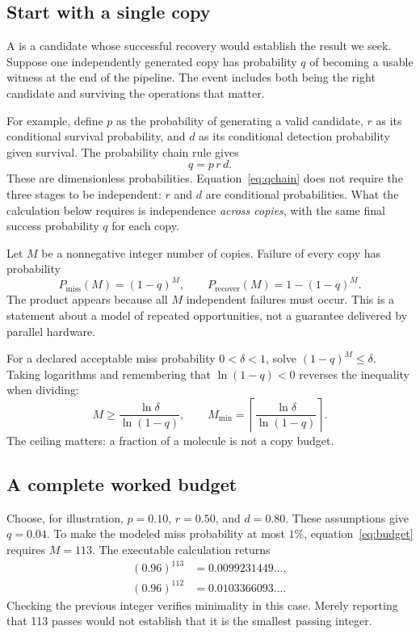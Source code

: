 \subsection{Start with a single copy}

A  is a candidate whose successful recovery would establish the result we seek. Suppose one independently generated copy has probability $q$ of becoming a usable witness at the end of the pipeline. The event includes both being the right candidate and surviving the operations that matter.

For example, define $p$ as the probability of generating a valid candidate, $r$ as its conditional survival probability, and $d$ as its conditional detection probability given survival. The probability chain rule gives
\begin{equation}
q=p\,r\,d. \label{eq:qchain}
\end{equation}
These are dimensionless probabilities. Equation~\ref{eq:qchain} does not require the three stages to be independent: $r$ and $d$ are conditional probabilities. What the calculation below requires is independence \emph{across copies}, with the same final success probability $q$ for each copy.

Let $M$ be a nonnegative integer number of copies. Failure of every copy has probability
\begin{equation}
P_{\mathrm{miss}}(M)=(1-q)^M,\qquad
P_{\mathrm{recover}}(M)=1-(1-q)^M. \label{eq:miss}
\end{equation}
The product appears because all $M$ independent failures must occur. This is a statement about a model of repeated opportunities, not a guarantee delivered by parallel hardware.

For a declared acceptable miss probability $0<\delta<1$, solve $(1-q)^M\leq\delta$. Taking logarithms and remembering that $\ln(1-q)<0$ reverses the inequality when dividing:
\begin{equation}
M\geq\frac{\ln\delta}{\ln(1-q)},\qquad
M_{\min}=\left\lceil\frac{\ln\delta}{\ln(1-q)}\right\rceil.
\label{eq:budget}
\end{equation}
The ceiling matters: a fraction of a molecule is not a copy budget.

\subsection{A complete worked budget}

Choose, for illustration, $p=0.10$, $r=0.50$, and $d=0.80$. These assumptions give $q=0.04$. To make the modeled miss probability at most $1\%$, equation~\ref{eq:budget} requires $M=113$. The executable calculation returns
\begin{align}
(0.96)^{113}&=0.0099231449\ldots,\\
(0.96)^{112}&=0.0103366093\ldots.
\end{align}
Checking the previous integer verifies minimality in this case. Merely reporting that 113 passes would not establish that it is the smallest passing integer.

